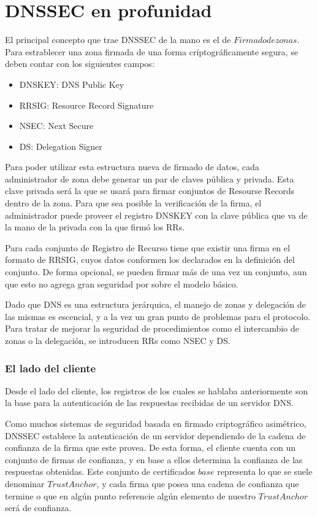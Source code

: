 \chapter{DNSSEC en profunidad}
El principal concepto que trae DNSSEC de la mano es el de $Firmado de zonas$. Para estrablecer una zona firmada de una forma críptográficamente segura, se deben contar con los siguientes campos:

\begin{itemize}
  \item DNSKEY: DNS Public Key
  \item RRSIG: Resource Record Signature
  \item NSEC: Next Secure
  \item DS: Delegation Signer
\end{itemize}

Para poder utilizar esta estructura nueva de firmado de datos, cada administrador de zona debe generar un par de claves pública y privada. Esta clave privada será la que se usará para firmar conjuntos de Resourse Records dentro de la zona. Para que sea posible la verificación de la firma, el administrador puede proveer el registro DNSKEY con la clave pública que va de la mano de la privada con la que firmó los RRs.

Para cada conjunto de Registro de Recurso tiene que existir una firma en el formato de RRSIG, cuyos datos conformen los declarados en la definición del conjunto. De forma opcional, se pueden firmar más de una vez un conjunto, aun que esto no agrega gran seguridad por sobre el modelo básico.

Dado que DNS es una estructura jerárquica, el manejo de zonas y delegación de las mismas es escencial, y a la vez un gran punto de problemas para el protocolo. Para tratar de mejorar la seguridad de procedimientos como el intercambio de zonas o la delegación, se introducen RRs como NSEC y DS.

\subsection{El lado del cliente}

Desde el lado del cliente, los registros de los cuales se hablaba anteriormente son la base para la autenticación de las respuestas recibidas de un servidor DNS.

Como muchos sistemas de seguridad basada en firmado criptográfico asimétrico, DNSSEC establece la autenticación de un servidor dependiendo de la cadena de confianza de la firma que este provea. De esta forma, el cliente cuenta con un conjunto de firmas de confianza, y en base a ellos determina la confianza de las respuestas obtenidas. Este conjunto de certificados $base$ representa lo que se suele denominar $Trust Anchor$, y cada firma que posea una cadena de confianza que termine o que en algún punto referencie algún elemento de nuestro $Trust Anchor$ será de confianza.

